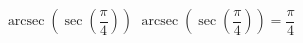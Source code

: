  {$\operatorname{arcsec}\left(\sec\left(\dfrac{\pi}{4}\right) \right)$ }
{ $\operatorname{arcsec}\left(\sec\left(\dfrac{\pi}{4}\right) \right) = \dfrac{\pi}{4}$ }
